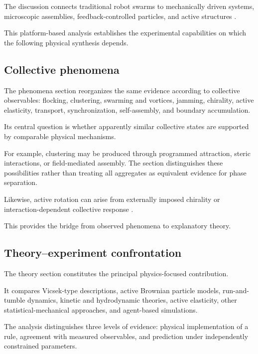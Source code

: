 The discussion connects traditional robot
swarms to mechanically driven systems,
microscopic assemblies, feedback-controlled
particles, and active structures
\cite{Rubenstein2014programmableselfas,Li2019particleroboticsba,Savoie2019arobotmadeofrobo,Sun2021swarmingmicrodrople,Yang2022emergentmicroroboti}.

This platform-based analysis establishes
the experimental capabilities on which
the following physical synthesis depends.

\subsection*{Collective phenomena}

The phenomena section reorganizes the same
evidence according to collective observables:
flocking, clustering, swarming and vortices,
jamming, chirality, active elasticity,
transport, synchronization, self-assembly,
and boundary accumulation.

Its central question is whether apparently
similar collective states are supported
by comparable physical mechanisms.

For example, clustering may be produced
through programmed attraction, steric
interactions, or field-mediated assembly.
The section distinguishes these possibilities
rather than treating all aggregates as
equivalent evidence for phase separation.

Likewise, active rotation can arise from
externally imposed chirality or
interaction-dependent collective response
\cite{Fruchart2022nonreciprocalphase,Chen2024persistentandrespo,Casiulis2025ageometricconditio}.

This provides the bridge from observed
phenomena to explanatory theory.

\subsection*{Theory--experiment confrontation}

The theory section constitutes the
principal physics-focused contribution.

It compares Vicsek-type descriptions,
active Brownian particle models,
run-and-tumble dynamics,
kinetic and hydrodynamic theories,
active elasticity,
other statistical-mechanical approaches,
and agent-based simulations.

The analysis distinguishes three
levels of evidence:
physical implementation of a rule,
agreement with measured observables,
and prediction under independently
constrained parameters.

